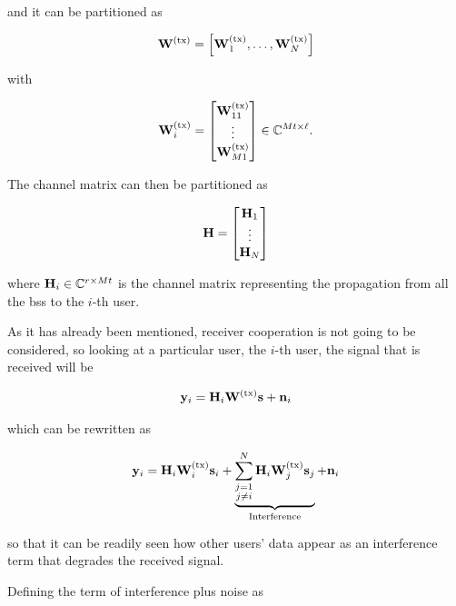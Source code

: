 \noindent
and it can be partitioned as

\begin{equation} \label{eq:precod_partition}
    \mathbf{W}^{(\text{tx})} = \left[ \mathbf{W}^{(\text{tx})}_1, \ldots, \mathbf{W}^{(\text{tx})}_N \right]
\end{equation}

\noindent
with

\begin{equation} \label{eq_precod_user}
    \mathbf{W}^{(\text{tx})}_i = \begin{bmatrix}
        \mathbf{W}^{(\text{tx})}_{11} \\
        \vdots \\
        \mathbf{W}^{(\text{tx})}_{M1}
    \end{bmatrix} \in \mathbb{C}^{Mt \times \ell}.
\end{equation}

The channel matrix can then be partitioned as

\begin{equation} \label{eq:ch_mat_partition}
    \mathbf{H} = \begin{bmatrix}
        \mathbf{H}_1 \\
        \vdots \\
        \mathbf{H}_N
    \end{bmatrix}
\end{equation}

\noindent
where $\mathbf{H}_i \in \mathbb{C}^{r \times Mt}$ is the channel matrix representing the
propagation from all the \glspl{bs} to the $i$-th user.

As it has already been mentioned, receiver cooperation is not going to be
considered, so looking at a particular user, \eg the $i$-th user, the
signal that is received will be

\begin{equation} \label{eq:rx_signal_user}
    \mathbf{y}_i = \mathbf{H}_i \mathbf{W}^{(\text{tx})} \mathbf{s} + \mathbf{n}_i
\end{equation}

\noindent
which can be rewritten as

\begin{equation} \label{eq:rx_signal_user_interf}
    \mathbf{y}_i = \mathbf{H}_i \mathbf{W}^{(\text{tx})}_i \mathbf{s}_i +
    \underbrace{\sum\limits_{\substack{j = 1\\j \neq i}}^{N} \mathbf{H}_i
        \mathbf{W}^{(\text{tx})}_j \mathbf{s}_j}_{\text{Interference}} + \mathbf{n}_i
\end{equation}

\noindent
so that it can be readily seen how other users' data appear as an interference
term that degrades the received signal.

Defining the term of interference plus noise as


